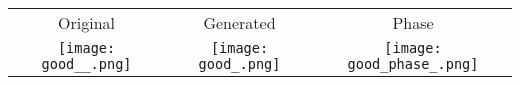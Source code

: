 \begin{tabular}{c @{\hskip 0pt} c @{\hskip 0pt} c }
    Original & Generated & Phase\\
    \texttt{[image: good\_\_.png]}&
    \texttt{[image: good\_.png]}&
    \texttt{[image: good\_phase\_.png]}
\end{tabular}
